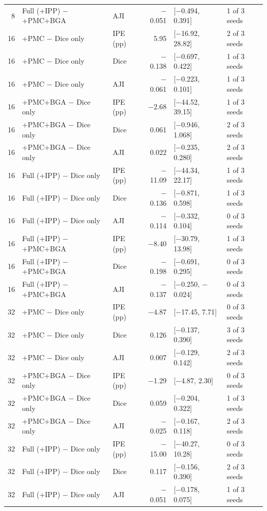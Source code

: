 \documentclass[10pt]{article}
\begin{document}
\begin{landscape}
{\begin{longtable}{r l l r l l}
8 & Full (+IPP) $-$ +PMC+BGA & AJI & $-$0.051 & [$-$0.494, 0.391] & 1 of 3 seeds \\
16 & +PMC $-$ Dice only & IPE (pp) & 5.95 & [$-$16.92, 28.82] & 2 of 3 seeds \\
16 & +PMC $-$ Dice only & Dice & $-$0.138 & [$-$0.697, 0.422] & 1 of 3 seeds \\
16 & +PMC $-$ Dice only & AJI & $-$0.061 & [$-$0.223, 0.101] & 1 of 3 seeds \\
16 & +PMC+BGA $-$ Dice only & IPE (pp) & $-$2.68 & [$-$44.52, 39.15] & 1 of 3 seeds \\
16 & +PMC+BGA $-$ Dice only & Dice & 0.061 & [$-$0.946, 1.068] & 2 of 3 seeds \\
16 & +PMC+BGA $-$ Dice only & AJI & 0.022 & [$-$0.235, 0.280] & 2 of 3 seeds \\
16 & Full (+IPP) $-$ Dice only & IPE (pp) & $-$11.09 & [$-$44.34, 22.17] & 1 of 3 seeds \\
16 & Full (+IPP) $-$ Dice only & Dice & $-$0.136 & [$-$0.871, 0.598] & 1 of 3 seeds \\
16 & Full (+IPP) $-$ Dice only & AJI & $-$0.114 & [$-$0.332, 0.104] & 0 of 3 seeds \\
16 & Full (+IPP) $-$ +PMC+BGA & IPE (pp) & $-$8.40 & [$-$30.79, 13.98] & 1 of 3 seeds \\
16 & Full (+IPP) $-$ +PMC+BGA & Dice & $-$0.198 & [$-$0.691, 0.295] & 0 of 3 seeds \\
16 & Full (+IPP) $-$ +PMC+BGA & AJI & $-$0.137 & [$-$0.250, $-$0.024] & 0 of 3 seeds \\
32 & +PMC $-$ Dice only & IPE (pp) & $-$4.87 & [$-$17.45, 7.71] & 0 of 3 seeds \\
32 & +PMC $-$ Dice only & Dice & 0.126 & [$-$0.137, 0.390] & 3 of 3 seeds \\
32 & +PMC $-$ Dice only & AJI & 0.007 & [$-$0.129, 0.142] & 2 of 3 seeds \\
32 & +PMC+BGA $-$ Dice only & IPE (pp) & $-$1.29 & [$-$4.87, 2.30] & 0 of 3 seeds \\
32 & +PMC+BGA $-$ Dice only & Dice & 0.059 & [$-$0.204, 0.322] & 1 of 3 seeds \\
32 & +PMC+BGA $-$ Dice only & AJI & $-$0.025 & [$-$0.167, 0.118] & 2 of 3 seeds \\
32 & Full (+IPP) $-$ Dice only & IPE (pp) & $-$15.00 & [$-$40.27, 10.28] & 0 of 3 seeds \\
32 & Full (+IPP) $-$ Dice only & Dice & 0.117 & [$-$0.156, 0.390] & 2 of 3 seeds \\
32 & Full (+IPP) $-$ Dice only & AJI & $-$0.051 & [$-$0.178, 0.075] & 1 of 3 seeds \\

\end{longtable}}
\end{landscape}
\end{document}
